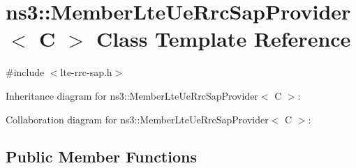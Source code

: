 \hypertarget{classns3_1_1MemberLteUeRrcSapProvider}{}\section{ns3\+:\+:Member\+Lte\+Ue\+Rrc\+Sap\+Provider$<$ C $>$ Class Template Reference}
\label{classns3_1_1MemberLteUeRrcSapProvider}


{\ttfamily \#include $<$lte-\/rrc-\/sap.\+h$>$}



Inheritance diagram for ns3\+:\+:Member\+Lte\+Ue\+Rrc\+Sap\+Provider$<$ C $>$\+:


Collaboration diagram for ns3\+:\+:Member\+Lte\+Ue\+Rrc\+Sap\+Provider$<$ C $>$\+:
\subsection*{Public Member Functions}
